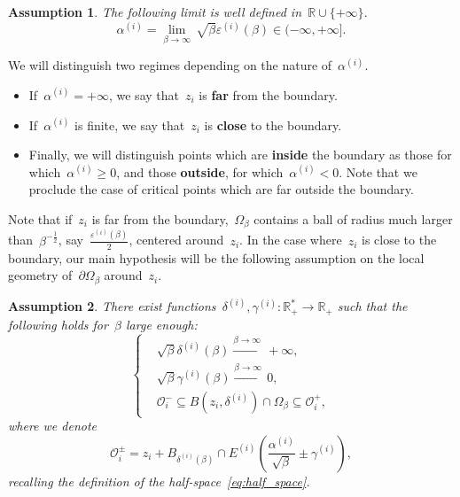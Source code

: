 \documentclass[10pt]{article}
\newcommand{\R}{\mathbb{R}}
\newcommand{\1}{\mathbbm 1}
\newcommand{\epsBoundary}[1]{\varepsilon^{(#1)}} %
\newcommand{\deltaRadius}[1]{\delta^{(#1)}} %
\newcommand{\epsLimit}[1]{\alpha^{(#1)}} %
\newcommand{\localNeighborhood}[2][]{\mathcal{O}_{#2}^{#1}} %
\newcommand{\gammaPerturbation}[1]{\gamma^{(#1)}}
\newcommand{\halfSpace}[1]{E^{(#1)}}
\newtheorem{hypothesis}{Assumption}
\begin{document}
    \begin{hypothesis}
    The following limit is well defined in~$\R\cup\{+\infty\}$.
    \begin{equation}
        \label{eq:epsLimit_definition}
        \tag{\bf H0}
        \epsLimit{i} =\underset{\beta\to\infty}{\lim}\, \sqrt\beta\epsBoundary{i}(\beta) \in (-\infty,+\infty].
    \end{equation}
    \end{hypothesis}

    We will distinguish two regimes depending on the nature of~$\epsLimit{i}$.
    \begin{itemize}
        \item If~$\epsLimit{i}= +\infty$, we say that~$z_i$ is {\bf far} from the boundary.
        \item If~$\epsLimit{i}$ is finite, we say that~$z_i$ is {\bf close} to the boundary.
        \item Finally, we will distinguish points which are {\bf inside} the boundary as those for which~$\epsLimit{i}\geq0$, and those {\bf outside}, for which~$\epsLimit{i}<0$. Note that we proclude the case of critical points which are far outside the boundary.
    \end{itemize}
    Note that if~$z_i$ is far from the boundary,~$\Omega_\beta$ contains a ball of radius much larger than~$\beta^{-\frac12}$, say~$\frac{\epsBoundary{i}(\beta)}2$, centered around~$z_i$.
    In the case where~$z_i$ is close to the boundary, our main hypothesis will be the following assumption on the local geometry of~$\partial\Omega_\beta$ around~$z_i$.

    \begin{hypothesis}     
        There exist functions~$\deltaRadius{i},\gammaPerturbation{i}:\R_+^*\to\R_+$ such that the following holds for~$\beta$ large enough:
        \begin{equation}
            \label{eq:supercritical_scaling_delta}
            \tag{\bf H1}
            \left\{\begin{aligned}
                &\sqrt\beta\deltaRadius{i}(\beta)\overset{\beta\to\infty}{\longrightarrow}\,+\infty,\\
                &\sqrt\beta\gammaPerturbation{i}(\beta)\overset{\beta\to\infty}{\longrightarrow}\,0,\\
                &\localNeighborhood[-]{i} \subseteq B(z_i,\deltaRadius{i})\cap\Omega_\beta \subseteq \localNeighborhood[+]{i},
            \end{aligned}\right.
        \end{equation}
        where we denote
        \begin{equation}
            \label{eq:capped_balls}
            \localNeighborhood[\pm]{i} = z_i + B_{\deltaRadius{i}(\beta)} \cap \halfSpace{i}\left(\frac{\epsLimit{i}}{\sqrt\beta}\pm\gammaPerturbation{i}\right),
        \end{equation}
        recalling the definition of the half-space~\eqref{eq:half_space}.
    \end{hypothesis}
\end{document}
